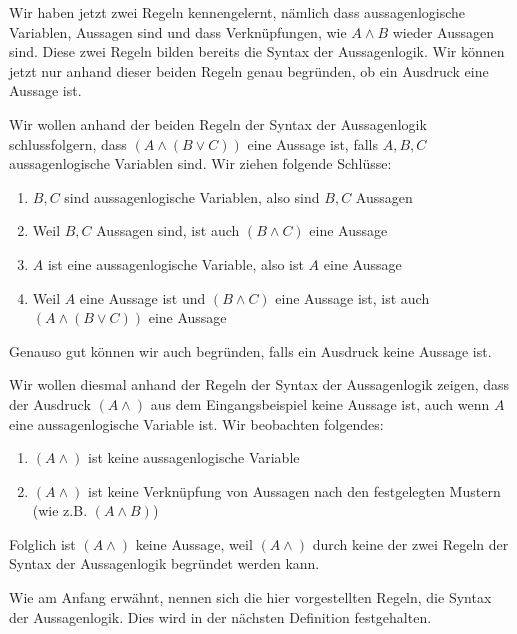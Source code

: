 \documentclass[../../main.tex]{subfiles}
\begin{document}
    Wir haben jetzt zwei Regeln kennengelernt, nämlich dass aussagenlogische Variablen,
    Aussagen sind und dass Verknüpfungen, wie $A \land B$ wieder Aussagen sind.
    Diese zwei Regeln
    bilden bereits die Syntax der Aussagenlogik.
    Wir können jetzt nur anhand dieser beiden Regeln genau begründen, ob
    ein Ausdruck eine Aussage ist.

    \begin{example}{}
        Wir wollen anhand der beiden Regeln der Syntax der Aussagenlogik schlussfolgern,
        dass $(A \land (B \lor C))$ eine Aussage ist, falls $A,B,C$ 
        aussagenlogische Variablen sind. Wir ziehen folgende Schlüsse:
        \begin{enumerate}
            \item $B,C$ sind aussagenlogische Variablen, also sind $B,C$ Aussagen
            \item Weil $B,C$ Aussagen sind, ist auch $(B \land C)$ eine Aussage
            \item $A$ ist eine aussagenlogische Variable, also ist $A$ eine Aussage
            \item Weil $A$ eine Aussage ist und $(B \land C)$ eine Aussage 
            ist, ist auch $(A \land (B \lor C))$ eine Aussage
        \end{enumerate}
    \end{example}

    Genauso gut können wir auch begründen, falls ein Ausdruck keine Aussage ist.

    \begin{example}{}
        Wir wollen diesmal anhand der Regeln der Syntax der Aussagenlogik zeigen,
        dass der Ausdruck $(A \land )$ aus dem Eingangsbeispiel 
        keine Aussage ist, auch 
        wenn $A$ eine aussagenlogische Variable ist. Wir beobachten folgendes:
        \begin{enumerate}
            \item $(A \land )$ ist keine aussagenlogische Variable
            \item $(A \land )$ ist keine Verknüpfung von 
            Aussagen nach den festgelegten Mustern (wie z.B. $(A \land B)$)
        \end{enumerate}
        Folglich ist $(A \land )$ keine Aussage, weil $(A \land )$ durch keine 
        der zwei Regeln der Syntax der Aussagenlogik begründet werden kann.
    \end{example}

    Wie am Anfang erwähnt, nennen sich die hier vorgestellten Regeln, die 
    Syntax der Aussagenlogik. Dies wird in der nächsten Definition festgehalten.
\end{document}
